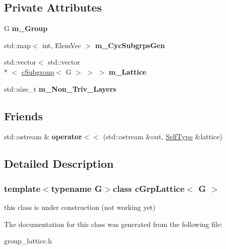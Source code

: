 \subsection*{Private Attributes}
\begin{DoxyCompactItemize}
\item 
\hypertarget{classcGrpLattice_adf219732413e288dd67173189a556bba}{G {\bfseries m\-\_\-\-Group}}\label{classcGrpLattice_adf219732413e288dd67173189a556bba}

\item 
\hypertarget{classcGrpLattice_a016e9d166b7cd74ef416bb4c4a22dfcc}{std\-::map$<$ int, Elem\-Vec $>$ {\bfseries m\-\_\-\-Cyc\-Subgrps\-Gen}}\label{classcGrpLattice_a016e9d166b7cd74ef416bb4c4a22dfcc}

\item 
\hypertarget{classcGrpLattice_a8a7ab9311e816bfa58c1f8ba727c5033}{std\-::vector$<$ std\-::vector\\*
$<$ \hyperlink{classcSubgroup}{c\-Subgroup}$<$ G $>$ $>$ $>$ {\bfseries m\-\_\-\-Lattice}}\label{classcGrpLattice_a8a7ab9311e816bfa58c1f8ba727c5033}

\item 
\hypertarget{classcGrpLattice_a2060764d98fd699bc63323b1d5eafb63}{std\-::size\-\_\-t {\bfseries m\-\_\-\-Non\-\_\-\-Triv\-\_\-\-Layers}}\label{classcGrpLattice_a2060764d98fd699bc63323b1d5eafb63}

\end{DoxyCompactItemize}
\subsection*{Friends}
\begin{DoxyCompactItemize}
\item 
\hypertarget{classcGrpLattice_a96ca24361f58299e265ac93d1296733b}{std\-::ostream \& {\bfseries operator$<$$<$} (std\-::ostream \&out, \hyperlink{classcGrpLattice}{Self\-Type} \&lattice)}\label{classcGrpLattice_a96ca24361f58299e265ac93d1296733b}

\end{DoxyCompactItemize}


\subsection{Detailed Description}
\subsubsection*{template$<$typename G$>$class c\-Grp\-Lattice$<$ G $>$}

this class is under construction (not working yet) 

The documentation for this class was generated from the following file\-:\begin{DoxyCompactItemize}
\item 
group\-\_\-lattice.\-h\end{DoxyCompactItemize}
